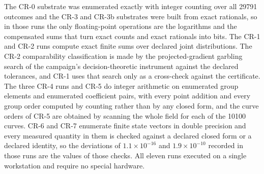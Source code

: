\documentclass[aps,pre,reprint,nofootinbib]{revtex4-2}
\begin{document}
The CR-0 substrate was enumerated exactly with integer counting over
all 29791 outcomes and the CR-3 and CR-3b substrates were built from
exact rationals, so in those runs the only floating-point operations
are the logarithms and the compensated sums that turn exact counts and
exact rationals into bits.  The CR-1 and CR-2 runs compute exact
finite sums over declared joint distributions.  The CR-2 comparability
classification is made by the projected-gradient garbling search of
the campaign's decision-theoretic instrument against the declared
tolerances, and CR-1 uses that search only as a cross-check against
the certificate.  The three CR-4 runs and CR-5 do integer arithmetic
on enumerated group elements and enumerated coefficient pairs, with
every point addition and every group order computed by counting rather
than by any closed form, and the curve orders of CR-5 are obtained by
scanning the whole field for each of the 10100 curves.  CR-6 and CR-7
enumerate finite state vectors in double precision and every measured
quantity in them is checked against a declared closed form or a
declared identity, so the deviations of $1.1\times10^{-16}$ and
$1.9\times10^{-10}$ recorded in those runs are the values of those
checks.  All eleven runs executed on a
single workstation and require no special hardware.
\end{document}

